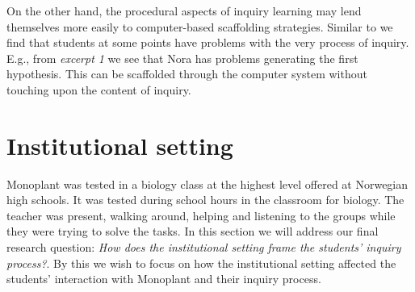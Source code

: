 On the other hand, the procedural aspects of inquiry learning may lend themselves more easily to computer-based scaffolding strategies. Similar to \citet{kluge2010simulation} we find that students at some points have problems with the very process of inquiry. E.g., from \emph{excerpt 1} we see that Nora has problems generating the first hypothesis. This can be scaffolded through the computer system without touching upon the content of inquiry. 














\section{Institutional setting}
Monoplant was tested in a biology class at the highest level offered at Norwegian high schools. It was tested during school hours in the classroom for biology. The teacher was present, walking around, helping and listening to the groups while they were trying to solve the tasks. In this section we will address our final research question: \emph{How does the institutional setting frame the students' inquiry process?}.
By this we wish to focus on how the institutional setting affected the students' interaction with Monoplant and their inquiry process. 

